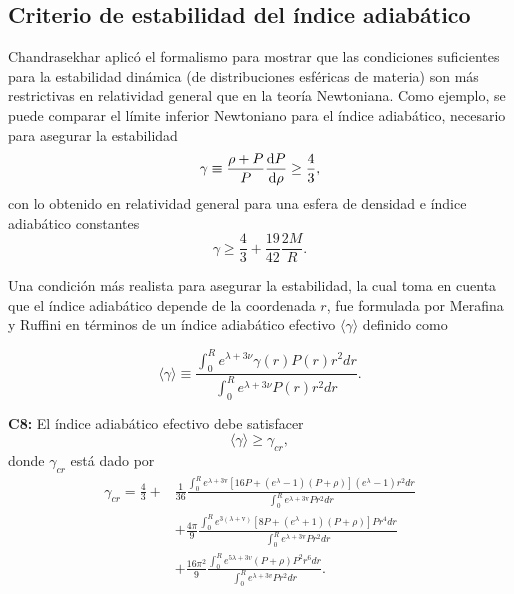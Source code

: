 \subsection*{Criterio de estabilidad del índice adiabático }

\noindent Chandrasekhar aplicó el formalismo para mostrar que las condiciones suficientes para la estabilidad dinámica (de distribuciones esféricas de materia) son más restrictivas en relatividad general que en la teoría Newtoniana. Como ejemplo, se puede comparar el límite inferior Newtoniano para el índice adiabático, necesario para asegurar la  estabilidad
\begin{equation}
    \gamma \equiv \frac { \rho + P  } { P } \dv{P}{\rho} \geq \frac{4}{3},
\end{equation}
con lo obtenido en relatividad general para una esfera de densidad e índice adiabático constantes
\begin{equation}
    \gamma \geq \frac{4}{3} +  \frac{19}{42} \frac{2M}{R}.
\end{equation}

Una condición más realista para asegurar la estabilidad, la cual toma en cuenta que el índice adiabático depende de la coordenada $r$, fue formulada por Merafina y Ruffini \cite{Merafina1989} en términos de un índice adiabático efectivo $\langle\gamma\rangle$ definido como

\begin{equation}
    \langle\gamma\rangle\equiv\frac{\int_{0}^{R} e^{\lambda+3 \nu} \gamma(r) P(r) r^{2} d r}{\int_{0}^{R} e^{\lambda+3 \nu} P(r) r^{2} d r}.
\end{equation}

\textbf{C8:} El índice adiabático efectivo debe satisfacer
\begin{equation}
     \langle\gamma\rangle \geq \gamma_{cr},
\end{equation}
donde $\gamma_{cr}$ está dado por
\begin{align}\label{gammacrit}
    \gamma_{cr} = \frac{4}{3} +& \frac{1}{36} \frac{\int_{0}^{R} e^{\lambda+3 \mathrm{v}}\left[16 P+\left(e^{\lambda}-1\right)\left(P+\rho \right)\right]\left(e^{\lambda}-1\right) r^{2} d r}{\int_{0}^{R} e^{\lambda+3 \mathrm{v}} P r^{2} d r} \nonumber
    \\ &+ \frac{4 \pi}{9} \frac{\int_{0}^{R} e^{3( \lambda+ \mathrm{v})}\left[8 P+\left(e^{\lambda}+1\right)\left(P+\rho \right)\right] P r^{4} d r}{\int_{0}^{R} e^{\lambda+3 \mathrm{v}} P r^{2} d r}
    \\ & + \frac{16 \pi^{2} }{9} \frac{\int_{0}^{R} e^{5 \lambda+3 v }\left(P+\rho \right) P^{2} r^{6} d r}{\int_{0}^{R} e^{\lambda+3 v } P r^{2} d r}. \nonumber
\end{align}

